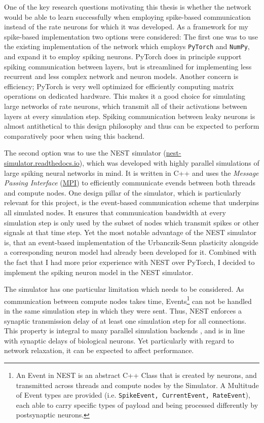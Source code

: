 One of the key research questions motivating this thesis is whether the network would be able to learn successfully when
employing spike-based communication instead of the rate neurons for which it was developed. As a framework for my
spike-based implementation two options were considered: The first one was to use the existing implementation of the
network which employs \texttt{PyTorch} and \texttt{NumPy}, and expand it to employ spiking neurons. PyTorch does in
principle support spiking communication between layers, but is streamlined for implementing less recurrent and less
complex network and neuron models. Another concern is efficiency; PyTorch is very well optimized for efficiently
computing matrix operations on dedicated hardware. This makes it a good choice for simulating large networks of rate
neurons, which transmit all of their activations between layers at every simulation step. Spiking communication between
leaky neurons is almost antithetical to this design philosophy and thus can be expected to perform comparatively poor
when using this backend.

The second option was to use the NEST simulator
(\href{https://nest-simulator.readthedocs.io}{nest-simulator.readthedocs.io}), which was developed with highly parallel
simulations of large spiking neural networks in mind. It is written in C++ and uses the \textit{Message Passing
Interface} (\href{https://www.mpi-forum.org/}{MPI}) to efficiently communicate evends between both threads and compute
nodes. One design pillar of the simulator, which is particularly relevant for this project, is the event-based
communication scheme that underpins all simulated nodes. It ensures that communication bandwidth at every simulation
step is only used by the subset of nodes which transmit spikes or other signals at that time step. Yet the most notable
advantage of the NEST simulator is, that an event-based implementation of the Urbanczik-Senn plasticity alongside a
corresponding neuron model had already been developed for it. Combined with the fact that I had more prior experience
with NEST over PyTorch, I decided to implement the spiking neuron model in the NEST simulator.

The simulator has one particular limitation which needs to be considered. As communication between compute nodes takes
time, Events\footnote{An Event in NEST is an abstract C++ Class that is created by neurons, and transmitted across
threads and compute nodes by the Simulator. A Multitude of Event types are provided (i.e. \texttt{SpikeEvent,
CurrentEvent, RateEvent}), each able to carry specific types of payload and being processed differently by postsynaptic
neurons.} can not be handled in the same simulation step in which they were sent. Thus, NEST enforces a synaptic
transmission delay of at least one simulation step for all connections. This property is integral to many parallel
simulation backends \citep{davies2018loihi,Hines1997,Schepper2022}, and is in line with synaptic delays of biological
neurons. Yet particularly with regard to network relaxation, it can be expected to affect performance.


